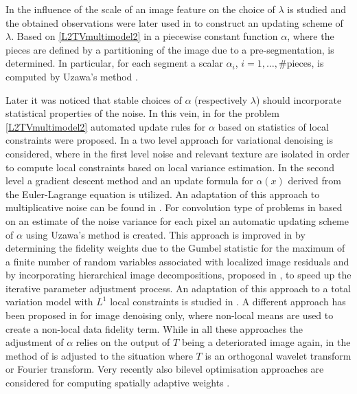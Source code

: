 \documentclass[enabledeprecatedfontcommands,cleardoublepage=empty,headsepline,twoside,11pt,DIV=15,BCOR=12mm,final]{scrartcl}
\begin{document}
In \cite{StrCha1996} the influence of the scale of an image feature on the choice of $\lambda$ is studied and the obtained observations were later used in \cite{StrBloCha1997} to construct an updating scheme of $\lambda$. Based on \eqref{L2TVmultimodel2} in \cite{BerCasRouSol} a piecewise constant function $\alpha$, where the pieces are defined by a partitioning of the image due to a pre-segmentation, is determined. In particular, for each segment a scalar $\alpha_i$, $i=1,\ldots,\#$pieces, is computed by Uzawa's method \cite{Cia}.

Later it was noticed that stable choices of $\alpha$ (respectively $\lambda$) should incorporate statistical properties of the noise. In this vein, in \cite{AlmBalCasHar,DonHinRin,GilSocZee} for the problem \eqref{L2TVmultimodel2} automated update rules for $\alpha$ based on statistics of local constraints were proposed. In \cite{GilSocZee} a two level approach for variational denoising is considered, where in the first level noise and relevant texture are isolated in order to compute local constraints based on local variance estimation. In the second level a gradient descent method and an update formula for $\alpha(x)$ derived from the Euler-Lagrange equation is utilized. An adaptation of this approach to multiplicative noise can be found in \cite{LiNgShe}. For convolution type of problems in \cite{AlmBalCasHar} based on an estimate of the noise variance for each pixel an automatic updating scheme of $\alpha$ using Uzawa's method is created. This approach is improved in \cite{DonHinRin} by determining the fidelity weights due to the Gumbel statistic for the maximum of a finite number of random variables associated with localized image residuals and by incorporating hierarchical image decompositions, proposed in \cite{TadNezVes2004,TadNezVes2008}, to speed up the iterative parameter adjustment process. An adaptation of this approach to a total variation model with $L^1$ local constraints is studied in \cite{HinRin}. A different approach has been proposed in \cite{SutDelAuj} for image denoising only, where non-local means \cite{BuaColMor} are used to create a non-local data fidelity term. While in all these approaches the adjustment of $\alpha$ relies on the output of $T$ being a deteriorated image again, in \cite{HinLan2015} the method of \cite{DonHinRin} is adjusted to the situation where $T$ is an orthogonal wavelet transform or Fourier transform. Very recently also bilevel optimisation approaches are considered for computing spatially adaptive weights \cite{ChuDeLSch,HinRau,HinRauWuLan}.
\end{document}
